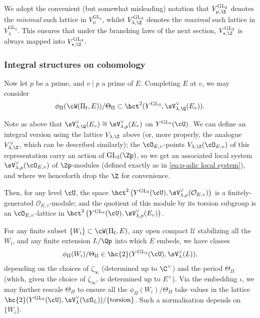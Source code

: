 \documentclass[10pt,reqno,a4paper]{amsart}
\newcommand{\GL}{\mathrm{GL}}
\begin{document}
We adopt the convenient (but somewhat misleading) notation that $V_{\mu,\Z}^{\GL_2}$ denotes the \emph{minimal} such lattice in $V_\mu^{\GL_2}$, whilst $V_{\lambda,\Z}^{\GL_3}$ denotes the \emph{maximal} such lattice in $V_\lambda^{\GL_3}$. This ensures that under the branching laws of the next section, $V_{\star,\Z}^{\GL_2}$ is always mapped into $V_{\star,\Z}^{\GL_3}$.

\subsubsection{Integral structures on cohomology}\label{sec:integral periods}

Now let $p$ be a prime, and $v \mid p$ a prime of $E$. Completing $E$ at $v$, we may consider
\[
\phi_{\Pi}(\cW(\Pi_{\mathrm{f}},E)) /\Theta_\Pi \subset \hct^2(Y^{\GL_3},\sV_{\lambda,\Q}^\vee(E_v)).
\]

Note as above that $\sV_{\lambda,\Q}^\vee(E_v) \cong \sV_{\lambda,p}^\vee(E_v)$ on $Y^{\GL_3}(\cU)$. We can define an integral version using the lattice $V_{\lambda,\Z}$ above (or, more properly, the analogue $V_{\lambda,\Z}^\vee$, which can be described similarly); the $\cO_{E,v}$-points $V_{\lambda,\Z}(\cO_{E,v})$ of this representation carry an action of $\GL_3(\Zp)$, so we get an associated local system  $\sV_{\lambda,p}^\vee(\cO_{E,v})$ of $\Zp$-modules (defined exactly as in \eqref{eq:p-adic local system}), and where we henceforth drop the $\Z$ for convenience.

 Then, for any level $\cU$, the space $\hct^2\left(Y^{\mathrm{GL}_3}(\cU), \sV_{\lambda,p}^\vee(\mathcal{O}_{E, v})\right)$ is a finitely-generated $\mathcal{O}_{E, v}$-module; and the quotient of this module by its torsion subgroup is an $\cO_{E, v}$-lattice in $\hct^2\left(Y^{\mathrm{GL}_3}(\cU), \sV_{\lambda,p}^\vee(E_v)\right)$. 

For any finite subset $\{W_i\} \subset \cW(\Pi_{\mathrm{f}},E)$, any open compact $\mathcal{U}$ stabilizing all the $W_i$, and any finite extension $L / \Qp$ into which $E$ embeds, we have classes
\begin{equation}
	\phi_\Pi(W_i)/\Theta_\Pi \in \hc{2}(Y^{\GL_3}(\cU),\sV_\lambda^\vee(L)),
\end{equation}
depending on the choices of $\zeta_\infty$ (determined up to $\C^\times$) and the period $\Theta_\Pi$ (which, given the choice of $\zeta_\infty$, is determined up to $E^\times$). Via the embedding $\iota$, we may further rescale $\Theta_\Pi$ to ensure all the $\phi_\Pi(W_i)/\Theta_\Pi$ take values in the lattice $\hc{2}(Y^{\GL_3}(\cU),\sV_\lambda^\vee(\cO_L)) / \mathrm{\{torsion\}}$. Such a normalisation depends on $\{W_i\}$.
\end{document}

